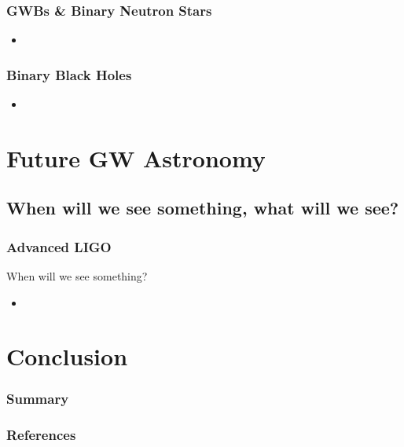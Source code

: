 \documentclass{beamer}
\def\gw#1{gravitational wave#1 (GW#1)\gdef\gw{GW}}
\def\gwb#1{gravitational wave burst#1 (GWB#1)\gdef\gw{GWB}}
\begin{document}
\begin{frame}
    \frametitle{GWBs \& Binary Neutron Stars}
    \begin{itemize}
        \item
    \end{itemize}
\end{frame}


\begin{frame}
    \frametitle{Binary Black Holes}
    \begin{itemize}
        \item
    \end{itemize}
\end{frame}

\section{Future GW Astronomy}

\begin{frame}
    \tableofcontents[currentsection]
\end{frame}

\subsection{When will we see something, what will we see?}

\begin{frame}
    \frametitle{Advanced LIGO}
    When will we see something?
    \begin{itemize}
        \item
    \end{itemize}
\end{frame}

\section{Conclusion}

\begin{frame}
    \frametitle{Summary}
\end{frame}

\begin{frame}
    \frametitle{References}
    
\end{frame}
\end{document}
